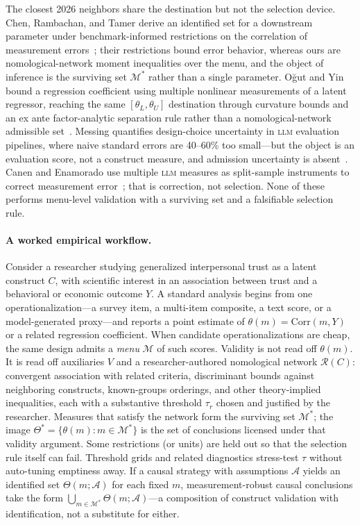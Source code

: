 \documentclass[10pt,letterpaper]{article}
\newcommand{\LLM}{\textsc{llm}}
\newcommand{\M}{\ensuremath{\mathcal{M}}}
\newcommand{\Rset}{\mathcal{R}}
\begin{document}
The closest 2026 neighbors share the destination but not the selection device.
Chen, Rambachan, and Tamer derive an identified set for a downstream parameter under benchmark-informed restrictions on the correlation of measurement errors~\cite{chenrttamer2026}; their restrictions bound error behavior, whereas ours are nomological-network moment inequalities over the menu, and the object of inference is the surviving set $\M^*$ rather than a single parameter.
O\u{g}ut and Yin bound a regression coefficient using multiple nonlinear measurements of a latent regressor, reaching the same $[\theta_L,\theta_U]$ destination through curvature bounds and an ex ante factor-analytic separation rule rather than a nomological-network admissible set~\cite{ogutyin2026}.
Messing quantifies design-choice uncertainty in \LLM{} evaluation pipelines, where naive standard errors are 40--60\% too small---but the object is an evaluation score, not a construct measure, and admission uncertainty is absent~\cite{messing2026}.
Canen and Enamorado use multiple \LLM{} measures as split-sample instruments to correct measurement error~\cite{canenenamorado2026}; that is correction, not selection.
None of these performs menu-level validation with a surviving set and a falsifiable selection rule.

\paragraph{A worked empirical workflow.}
Consider a researcher studying generalized interpersonal trust as a latent construct $C$, with scientific interest in an association between trust and a behavioral or economic outcome $Y$.
A standard analysis begins from one operationalization---a survey item, a multi-item composite, a text score, or a model-generated proxy---and reports a point estimate of $\theta(m)=\mathrm{Corr}(m,Y)$ or a related regression coefficient.
When candidate operationalizations are cheap, the same design admits a \emph{menu} $\M$ of such scores.
Validity is not read off $\theta(m)$.
It is read off auxiliaries $V$ and a researcher-authored nomological network $\Rset(C)$: convergent association with related criteria, discriminant bounds against neighboring constructs, known-groups orderings, and other theory-implied inequalities, each with a substantive threshold $\tau_r$ chosen and justified by the researcher.
Measures that satisfy the network form the surviving set $\M^*$; the image $\Theta^*=\{\theta(m):m\in\M^*\}$ is the set of conclusions licensed under that validity argument.
Some restrictions (or units) are held out so that the selection rule itself can fail.
Threshold grids and related diagnostics stress-test $\tau$ without auto-tuning emptiness away.
If a causal strategy with assumptions $\mathcal{A}$ yields an identified set $\Theta(m;\mathcal{A})$ for each fixed $m$, measurement-robust causal conclusions take the form $\bigcup_{m\in\M^*}\Theta(m;\mathcal{A})$---a composition of construct validation with identification, not a substitute for either.
\end{document}
